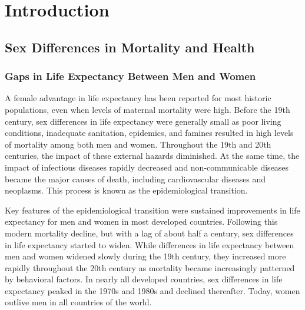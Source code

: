




\chapter{Introduction}

\section{Sex Differences in Mortality and Health}

\subsection{Gaps in Life Expectancy Between Men and Women}

A female advantage in life expectancy has been reported for most 
historic populations, even when levels of maternal mortality were 
high.\citep{klasen1998marriage,mcnay2005excess,zarulli2018women} 
Before the 19th century, sex differences in life expectancy were 
generally small as poor living conditions, inadequate sanitation, 
epidemics, and famines resulted in high levels of mortality among 
both men and women.\citep{thorslund2013} Throughout the 19th and 
20th centuries, the impact of these external hazards diminished. 
At the same time, the impact of infectious diseases rapidly decreased 
and non-communicable diseases became the major causes of death, 
including cardiovascular diseases and neoplasms. This process is 
known as the epidemiological transition.\citep{omran1971epidemiologic,
blacher2016epidemiological}

Key features of the epidemiological transition were sustained 
improvements in life expectancy for men and women in most developed 
countries.\citep{christensen2009ageing} Following this modern mortality 
decline, but with a lag of about half a century, sex differences 
in life expectancy started to widen. While differences in life 
expectancy between men and women widened slowly during the 19th century, 
they increased more rapidly throughout the 20th century as mortality 
became increasingly patterned by behavioral factors.\citep{vallin2004convergences,gjonca2005} 
In nearly all developed countries, sex differences in life expectancy 
peaked in the 1970s and 1980s and declined thereafter.\citep{glei2007narrowing,clark2012examining} 
Today, women outlive men in all countries of the world.\citep{barford2006life,desa2017world}

